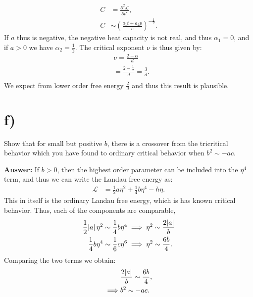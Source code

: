 \documentclass[a4paper]{article}
\newcommand{\newparagraph}{\vspace{.5cm}\noindent}
\newcommand{\fpartial}[2]{\frac{\partial #1}{\partial #2}}
\begin{document}
\begin{align*}
    C &= \fpartial{^2\mathcal{L}}{t^2},\\
    C&\sim\left(\frac{a_1t + a_2p}{c}\right)^{-\frac{1}{2}}.
\end{align*}If $a$ thus is negative, the negative heat capacity is not real, and thus $\alpha_1 = 0$, and if $a>0$ we have $\alpha_2 = \frac{1}{2}$.
The critical exponent $\nu$ is thus given by:
\begin{align*}
    &\nu = \frac{2-\alpha}{d}\\
    &= \frac{2-\frac{1}{2}}{d} = \frac{3}{d}.\\
\end{align*}We expect from lower order free energy $\frac{2}{d}$ and thus this result is plausible.


\section*{f)}
Show that for small but positive $b$, there is a crossover from the tricritical behavior which you have found to ordinary critical behavior when $b^2\sim - ac$.

\newparagraph
\textbf{Answer: }If $b>0$, then the highest order parameter can be included into the $\eta^4$ term, and thus we can write the Landau free energy as:
\begin{align*}
    \mathcal{L} &= \frac{1}{2}a\eta^2 + \frac{1}{4}b\eta^4 - h\eta.
\end{align*}This in itself is the ordinary Landau free energy, which is has known critical behavior.
Thus, each of the components are comparable,
\begin{align*}
    \frac{1}{2}\abs{a}\eta^2 &\sim \frac{1}{4}b\eta^4\implies \eta^2 \sim \frac{2\abs{a}}{b}\\
    \frac{1}{4}b\eta^4 &\sim \frac{1}{6}c\eta^6 \implies \eta^2 \sim \frac{6b}{4}.
\end{align*}Comparing the two terms we obtain:
\begin{align*}
    &\frac{2\abs{a}}{b}\sim \frac{6b}{4},\\
    \implies& b^2 \sim -ac.
\end{align*}
\end{document}
